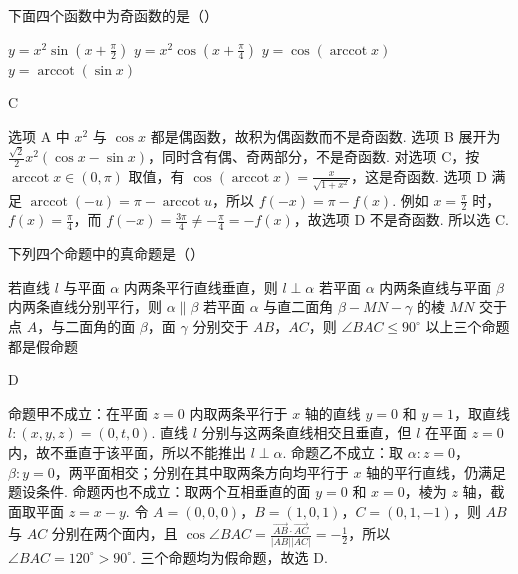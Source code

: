 \begin{problem}
下面四个函数中为奇函数的是（\quad）

\choices
    {\(y=x^2\sin\left( x+\frac{\pi}{2} \right)\)}
    {\(y=x^2\cos\left( x+\frac{\pi}{4} \right)\)}
    {\(y=\cos(\operatorname{arccot} x)\)}
    {\(y=\operatorname{arccot}(\sin x)\)}
\end{problem}

\begin{answer}
C
\end{answer}

\begin{solution}
选项 A 中 \(x^2\) 与 \(\cos x\) 都是偶函数，故积为偶函数而不是奇函数. 选项 B 展开为 \(\frac{\sqrt{2}}{2}x^2(\cos x-\sin x)\)，同时含有偶、奇两部分，不是奇函数. 对选项 C，按 \(\operatorname{arccot}x\in(0,\pi)\) 取值，有 \(\cos(\operatorname{arccot}x)=\frac{x}{\sqrt{1+x^2}}\)，这是奇函数. 选项 D 满足 \(\operatorname{arccot}(-u)=\pi-\operatorname{arccot}u\)，所以 \(f(-x)=\pi-f(x)\). 例如 \(x=\frac{\pi}{2}\) 时，\(f(x)=\frac{\pi}{4}\)，而 \(f(-x)=\frac{3\pi}{4}\ne-\frac{\pi}{4}=-f(x)\)，故选项 D 不是奇函数. 所以选 C.
\end{solution}

\begin{problem}
下列四个命题中的真命题是（\quad）

\choices
    {若直线 \(l\) 与平面 \(\alpha\) 内两条平行直线垂直，则 \(l\perp \alpha\)}
    {若平面 \(\alpha\) 内两条直线与平面 \(\beta\) 内两条直线分别平行，则 \(\alpha\parallel \beta\)}
    {若平面 \(\alpha\) 与直二面角 \(\beta-MN-\gamma\) 的棱 \(MN\) 交于点 \(A\)，与二面角的面 \(\beta\)，面 \(\gamma\) 分别交于 \(AB\)，\(AC\)，则 \(\angle BAC\leqslant 90^\circ\)}
    {以上三个命题都是假命题}
\end{problem}

\begin{answer}
D
\end{answer}

\begin{solution}
命题甲不成立：在平面 \(z=0\) 内取两条平行于 \(x\) 轴的直线 \(y=0\) 和 \(y=1\)，取直线 \(l:(x,y,z)=(0,t,0)\). 直线 \(l\) 分别与这两条直线相交且垂直，但 \(l\) 在平面 \(z=0\) 内，故不垂直于该平面，所以不能推出 \(l\perp\alpha\). 命题乙不成立：取 \(\alpha:z=0\)，\(\beta:y=0\)，两平面相交；分别在其中取两条方向均平行于 \(x\) 轴的平行直线，仍满足题设条件. 命题丙也不成立：取两个互相垂直的面 \(y=0\) 和 \(x=0\)，棱为 \(z\) 轴，截面取平面 \(z=x-y\). 令 \(A=(0,0,0)\)，\(B=(1,0,1)\)，\(C=(0,1,-1)\)，则 \(AB\) 与 \(AC\) 分别在两个面内，且 \(\cos\angle BAC=\frac{\overrightarrow{AB}\cdot\overrightarrow{AC}}{|AB||AC|}=-\frac{1}{2}\)，所以 \(\angle BAC=120^\circ>90^\circ\). 三个命题均为假命题，故选 D.
\end{solution}

